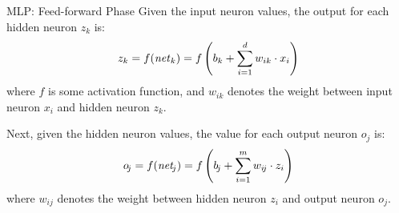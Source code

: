 \begin{frame}{MLP: Feed-forward Phase}
%
%
Given the input neuron values,  
the output %
for each hidden neuron $z_k$ is:
\begin{align*}
    z_k = f(\mathit{net}_k) = f\left(b_k + \sum_{i=1}^d w_{ik} \cdot x_i\right)
\end{align*}
where $f$ is some activation function, and $w_{ik}$ denotes the weight
between input neuron $x_i$ and hidden neuron $z_k$.

	\medskip

Next, given the hidden
neuron values, %
the value for each output
neuron $o_{\!j}$ is: %
\begin{align*}
    o_{\!j} = f(\mathit{net}_{\!j}) = f\left(b_{\!j} + \sum_{i=1}^m w_{i\!j}
    \cdot z_i\right)
\end{align*}
where $w_{ij}$ denotes the weight between hidden neuron $z_i$ and output
neuron $o_{\!j}$.
\end{frame}
%
